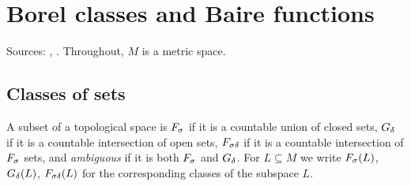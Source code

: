 \section{Borel classes and Baire functions}\label{sec:baire}
Sources: \cite[Introduction, \S3]{Diss}, \cite[Appendix]{TAMSb}. Throughout, $M$ is a metric space.

\subsection{Classes of sets}

\begin{definition}\label{def:borel-classes}
A subset of a topological space is $F_\sigma$ if it is a countable union of closed sets, $G_\delta$ if it is a
countable intersection of open sets, $F_{\sigma\delta}$ if it is a countable intersection of $F_\sigma$ sets, and
\emph{ambiguous} if it is both $F_\sigma$ and $G_\delta$. For $L\subseteq M$ we write $F_\sigma(L)$, $G_\delta(L)$,
$F_{\sigma\delta}(L)$ for the corresponding classes of the subspace $L$.
\end{definition}

